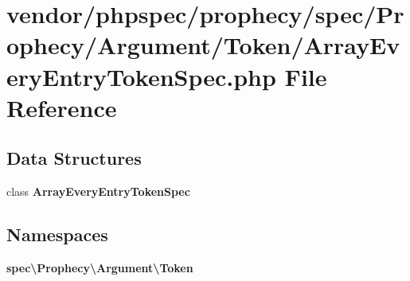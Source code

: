 \section{vendor/phpspec/prophecy/spec/\+Prophecy/\+Argument/\+Token/\+Array\+Every\+Entry\+Token\+Spec.php File Reference}
\label{_array_every_entry_token_spec_8php}
\subsection*{Data Structures}
\begin{DoxyCompactItemize}
\item 
class {\bf Array\+Every\+Entry\+Token\+Spec}
\end{DoxyCompactItemize}
\subsection*{Namespaces}
\begin{DoxyCompactItemize}
\item 
 {\bf spec\textbackslash{}\+Prophecy\textbackslash{}\+Argument\textbackslash{}\+Token}
\end{DoxyCompactItemize}
